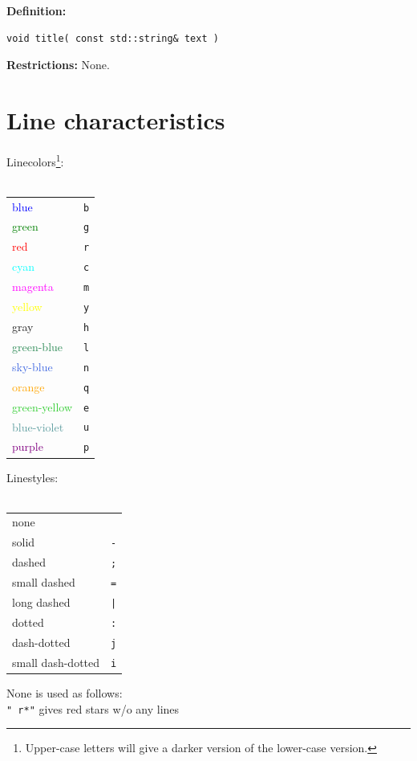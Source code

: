 \documentclass[a4paper]{article}
\begin{document}
\textbf{Definition:}
\begin{lstlisting}
void title( const std::string& text )
\end{lstlisting}
%
\textbf{Restrictions:} None.

\section{Line characteristics}

\begin{minipage}{3cm}
  Linecolors\footnote{
  Upper-case letters will give a darker version of the lower-case version.
  }:\\ \\
  \begin{tabular}{l|c}
    \textcolor{blue}{blue} & \texttt{b} \\
    \textcolor{green}{green} & \texttt{g} \\
    \textcolor{red}{red} & \texttt{r} \\
    \textcolor{cyan}{cyan} & \texttt{c} \\
    \textcolor{magenta}{magenta} & \texttt{m} \\
    \textcolor{yellow}{yellow} & \texttt{y} \\
    \textcolor[gray]{0.5}{gray} & \texttt{h} \\
    \textcolor{SeaGreen}{green-blue} & \texttt{l} \\
    \textcolor{RoyalBlue}{sky-blue} & \texttt{n} \\
    \textcolor{orange}{orange} & \texttt{q} \\
    \textcolor{LimeGreen}{green-yellow} & \texttt{e} \\
    \textcolor{CadetBlue}{blue-violet} & \texttt{u} \\
    \textcolor{purple}{purple} & \texttt{p}
  \end{tabular}
\end{minipage}
\hfill
\begin{minipage}{4cm}
  Linestyles:\\ \\
  \begin{tabular}{l|c}
    none & \\
    solid & \texttt{-} \\
    dashed & \texttt{;} \\
    small dashed & \texttt{=} \\
    long dashed & \texttt{|} \\
    dotted & \texttt{:} \\
    dash-dotted & \texttt{j} \\
    small dash-dotted & \texttt{i} 
  \end{tabular}
  None is used as follows: \\
  \texttt{" r*"} gives red stars w/o any lines
\end{minipage}
\end{document}
